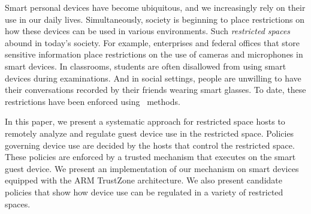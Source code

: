Smart personal devices have become ubiquitous, and we increasingly rely on
their use in our daily lives. Simultaneously, society is beginning to place
restrictions on how these devices can be used in various environments. Such
\textit{restricted spaces} abound in today's society. For example, enterprises
and federal offices that store sensitive information place restrictions on the
use of cameras and microphones in smart devices. In classrooms, students are
often disallowed from using smart devices during examinations. And in social
settings, people are unwilling to have their conversations recorded by their
friends wearing smart glasses. To date, these restrictions have been enforced
using \adhoc\ methods.

In this paper, we present a systematic approach for restricted space hosts to
remotely analyze and regulate guest device use in the restricted space.
Policies governing device use are decided by the hosts that control the
restricted space. These policies are enforced by a trusted mechanism that
executes on the smart guest device. We present an implementation of our
mechanism on smart devices equipped with the ARM TrustZone architecture. We
also present candidate policies that show how device use can be regulated in a
variety of restricted spaces.
